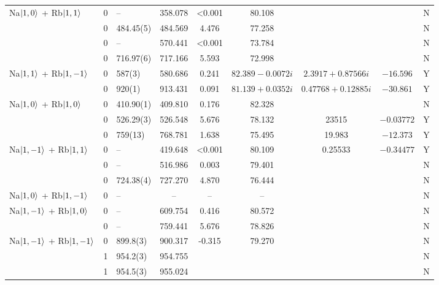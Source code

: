 \begin{sidewaystable}[thp]
\begin{tabular}{l|c|l|c|c|c|c|c|c}
Na$\ket{1,0}$ + Rb$\ket{1,1}$   & 0   	&  	--		        & 358.078 			& <0.001  & 80.108                & & & N     \\
								& 0   	& 484.45(5)         & 484.569 			& 4.476  & 77.258                 & & & N     \\
								& 0		& 	--				& 570.441			& <0.001	& 73.784			 & & & N \\
								& 0   	& 716.97(6)         & 717.166 			& 5.593  & 72.998                 & & & N     \\  \hline
Na$\ket{1,1}$ + Rb$\ket{1,-1}$ 	& 0    	& 587(3)         & 580.686 			& 0.241  & $82.389 - 0.0072 i $  & $2.3917 + 0.87566 i$&$-16.596$& Y     \\
							  	& 0    	& 920(1)         & 913.431 			& 0.091  & $81.139 + 0.0352 i$ & $0.47768 + 0.12885 i$& $-30.861$& Y     \\ \hline
Na$\ket{1,0}$ + Rb$\ket{1,0}$  	& 0    	& 410.90(1)         & 409.810 			& 0.176  & 82.328                 & & & N     \\
    							& 0    	& 526.29(3)         & 526.548 			& 5.676  & 78.132                 &23515 &$-0.03772$ & Y     \\
    							& 0    	& 759(13)           & 768.781 			& 1.638  & 75.495                 &19.983 &$-12.373$ & Y     \\ \hline
Na$\ket{1,-1}$ + Rb$\ket{1,1}$ 	& 0    	& --		        & 419.648 			& <0.001  & 80.109                &0.25533 &$-0.34477$ & Y     \\
								& 0    	& --        		& 516.986 			& 0.003  & 79.401                 & & & N     \\	
								& 0    	& 724.38(4)         & 727.270 			& 4.870  & 76.444                 & & & N     \\ \hline
Na$\ket{1,0}$ + Rb$\ket{1,-1}$  & 0    	& --          		& -- 			& -- & --                             & & & N     \\ \hline
Na$\ket{1,-1}$ + Rb$\ket{1,0}$  & 0    	& --          		& 609.754 			& 0.416 & 80.572                  & & & N     \\
								& 0		& --				& 759.441			& 5.676 & 78.826				  & & & N \\ \hline	
Na$\ket{1,-1}$ + Rb$\ket{1,-1}$ & 0    	& 899.8(3)          & 900.317 			& -0.315 & 79.270                 & & & N     \\
								& 1    	& 954.2(3)          & 954.755 			&   &         				      & & & N     \\
								& 1    	& 954.5(3)          & 955.024 			&   &         					  & & & N     \\
\hline \hline
\end{tabular}
\end{sidewaystable}

